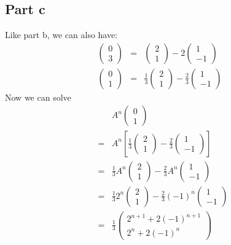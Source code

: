 \subsection*{Part c}
Like part b, we can also have:
\begin{eqnarray*}
\left(\begin{array}{c}
0 \\
3
\end{array}\right) &=& 
\left(\begin{array}{c}
2 \\
1
\end{array}\right)
-2
\left(\begin{array}{c}
1 \\
-1
\end{array}\right) \\
\left(\begin{array}{c}
0 \\
1
\end{array}\right) &=& 
\frac{1}{3}\left(\begin{array}{c}
2 \\
1
\end{array}\right)
-
\frac{2}{3}\left(\begin{array}{c}
1 \\
-1
\end{array}\right)
\end{eqnarray*}
Now we can solve
\begin{eqnarray*}
  & & A^n\left(\begin{array}{c}
0 \\
1
\end{array}\right) \\
  &=& A^n \left[\frac{1}{3}\left(\begin{array}{c}
2 \\
1
\end{array}\right)
-
\frac{2}{3}\left(\begin{array}{c}
1 \\
-1
\end{array}\right)\right] \\
  &=& \frac{1}{3}A^n\left(\begin{array}{c}
2 \\
1
\end{array}\right)
-
\frac{2}{3}A^n\left(\begin{array}{c}
1 \\
-1
\end{array}\right) \\
  &=& \frac{1}{3}2^n\left(\begin{array}{c}
2 \\
1
\end{array}\right)
-
\frac{2}{3}(-1)^n\left(\begin{array}{c}
1 \\
-1
\end{array}\right) \\
  &=& \frac{1}{3}\left(\begin{array}{c}
2^{n+1} + 2(-1)^{n+1} \\
2^n + 2(-1)^n
\end{array}\right) \\
\end{eqnarray*}